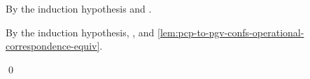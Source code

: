 \begin{case*}
  By the induction hypothesis and .
\end{case*}
\begin{case*}
  By the induction hypothesis, ,
  and \cref{lem:pcp-to-pgv-confs-operational-correspondence-equiv}.
\end{case*}
\qed


